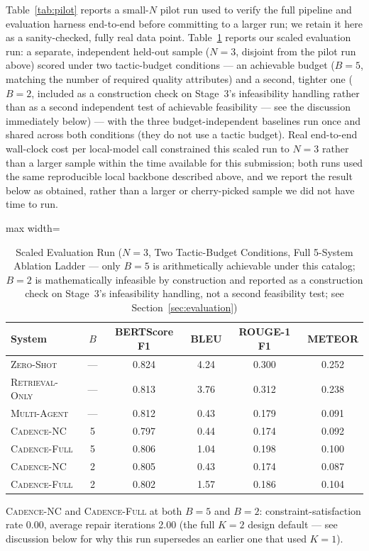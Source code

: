 \documentclass[preprint,12pt,authoryear]{elsarticle}
\newcommand{\sysZS}{\textsc{Zero-Shot}}
\newcommand{\sysRO}{\textsc{Retrieval-Only}}
\newcommand{\sysMA}{\textsc{Multi-Agent}}
\newcommand{\sysNC}{\textsc{Cadence-NC}}
\newcommand{\sysFull}{\textsc{Cadence-Full}}
\renewcommand{\_}{\textunderscore\allowbreak{}}
\begin{document}
Table~\ref{tab:pilot} reports a small-$N$ pilot run used to verify the full pipeline and evaluation harness end-to-end before committing to a larger run; we retain it here as a sanity-checked, fully real data point. Table~\ref{tab:scaled} reports our scaled evaluation run: a separate, independent held-out sample ($N=3$, disjoint from the pilot run above) scored under two tactic-budget conditions --- an achievable budget ($B=5$, matching the number of required quality attributes) and a second, tighter one ($B=2$, included as a construction check on Stage~3's infeasibility handling rather than as a second independent test of achievable feasibility --- see the discussion immediately below) --- with the three budget-independent baselines run once and shared across both conditions (they do not use a tactic budget). Real end-to-end wall-clock cost per local-model call constrained this scaled run to $N=3$ rather than a larger sample within the time available for this submission; both runs used the same reproducible local backbone described above, and we report the result below as obtained, rather than a larger or cherry-picked sample we did not have time to run.

\begin{table}[!htbp]
\caption{Scaled Evaluation Run ($N=3$, Two Tactic-Budget Conditions, Full 5-System Ablation Ladder --- only $B=5$ is arithmetically achievable under this catalog; $B=2$ is mathematically infeasible by construction and reported as a construction check on Stage~3's infeasibility handling, not a second feasibility test; see Section~\ref{sec:evaluation})\label{tab:scaled}}
\centering
\begin{adjustbox}{max width=\textwidth}
\begin{tabular}{@{}lccccc@{}}
\toprule
System & $B$ & BERTScore F1 & BLEU & ROUGE-1 F1 & METEOR \\
\midrule
\sysZS{}             & --- & 0.824 & 4.24 & 0.300 & 0.252 \\
\sysRO{}        & --- & 0.813 & 3.76 & 0.312 & 0.238 \\
\sysMA{} & --- & 0.812 & 0.43 & 0.179 & 0.091 \\
\sysNC{}  & 5   & 0.797 & 0.44 & 0.174 & 0.092 \\
\sysFull{}          & 5   & 0.806 & 1.04 & 0.198 & 0.100 \\
\sysNC{}  & 2   & 0.805 & 0.43 & 0.174 & 0.087 \\
\sysFull{}          & 2   & 0.802 & 1.57 & 0.186 & 0.104 \\
\bottomrule
\end{tabular}
\end{adjustbox}

\vspace{2pt}
\footnotesize \sysNC{} and \sysFull{} at both $B=5$ and $B=2$: constraint-satisfaction rate 0.00, average repair iterations 2.00 (the full $K=2$ design default --- see discussion below for why this run supersedes an earlier one that used $K=1$).
\end{table}
\FloatBarrier
\end{document}
